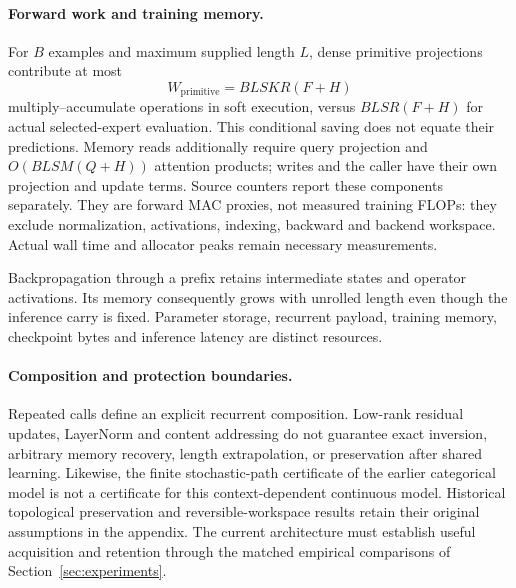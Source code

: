\paragraph{Forward work and training memory.}
For $B$ examples and maximum supplied length $L$, dense primitive projections
contribute at most
\begin{equation}
 W_{\mathrm{primitive}}=BLSKR(F+H)
\end{equation}
multiply--accumulate operations in soft execution, versus
$BLSR(F+H)$ for actual selected-expert evaluation. This conditional saving
does not equate their predictions. Memory reads additionally require query
projection and $O(BLSM(Q+H))$ attention products; writes and the caller have
their own projection and update terms. Source counters report these components
separately. They are forward MAC proxies, not measured training FLOPs: they
exclude normalization, activations, indexing, backward and backend workspace.
Actual wall time and allocator peaks remain necessary measurements.

Backpropagation through a prefix retains intermediate states and operator
activations. Its memory consequently grows with unrolled length even though
the inference carry is fixed. Parameter storage, recurrent payload, training
memory, checkpoint bytes and inference latency are distinct resources.

\paragraph{Composition and protection boundaries.}
Repeated calls define an explicit recurrent composition. Low-rank residual
updates, LayerNorm and content addressing do not guarantee exact inversion,
arbitrary memory recovery, length extrapolation, or preservation after shared
learning. Likewise, the finite stochastic-path certificate of the earlier
categorical model is not a certificate for this context-dependent continuous
model. Historical topological preservation and reversible-workspace results
retain their original assumptions in the appendix. The current architecture
must establish useful acquisition and retention through the matched empirical
comparisons of Section~\ref{sec:experiments}.
